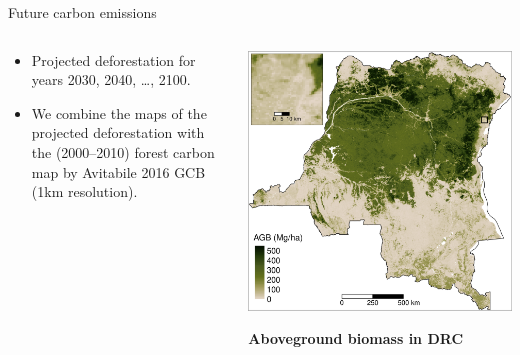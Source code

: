 \documentclass[10pt,table,dvipsnames,compress]{beamer}
\begin{document}
\begin{frame}[label={sec:orgc1153bb}]{Future carbon emissions}
\begin{columns}
\begin{column}{0.5\columnwidth}
\begin{itemize}
\item Projected deforestation for years 2030, 2040, \ldots{}, 2100.
\item We combine the maps of the projected deforestation with the
(2000--2010) forest carbon map by Avitabile 2016 GCB (1km resolution).
\end{itemize}
\end{column}

\begin{column}{0.5\columnwidth}
\includegraphics[width=\textwidth]{figs/sm/AGB}

\textbf{Aboveground biomass in DRC}
\end{column}
\end{columns}
\end{frame}
\end{document}

